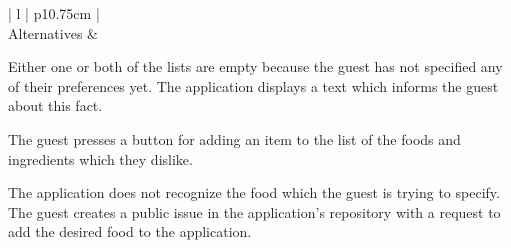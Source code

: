 \begin{center}
\begin{tabular}{| l | p{10.75cm} | }
    \\
    \hline
    Alternatives &
    \begin{minipage}[t]{\linewidth}
      \begin{description}[nosep,after=\strut]
        \item [A1:] Either one or both of the lists are empty because the guest has not specified any of their preferences yet. The application displays a text which informs the guest about this fact.
        \item [A2:] The guest presses a button for adding an item to the list of the foods and ingredients which they dislike.
        \item [A3:] The application does not recognize the food which the guest is trying to specify. The guest creates a public issue in the application's repository with a request to add the desired food to the application.
      \end{description}
    \end{minipage}
    \\
    \hline
  \end{tabular}
  \newline
\end{center}

\newpage

